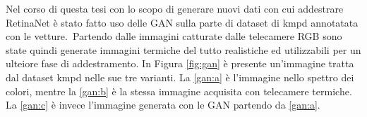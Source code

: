 Nel corso di questa tesi con lo scopo di generare nuovi dati con cui addestrare RetinaNet è stato fatto uso delle \ac{GAN} sulla parte di dataset di \ac{kmpd} annotatata con le vetture. Partendo dalle immagini catturate dalle telecamere RGB sono state quindi generate immagini termiche del tutto realistiche ed utilizzabili per un ulteiore fase di addestramento. In Figura \ref{fig:gan} è presente un'immagine tratta dal dataset \ac{kmpd} nelle sue tre varianti. La \ref{gan:a} è l'immagine nello spettro dei colori, mentre la \ref{gan:b} è la stessa immagine acquisita con telecamere termiche. La \ref{gan:c} è invece l'immagine generata con le \ac{GAN} partendo da \ref{gan:a}.
\begin{figure}[]
    \begin{minipage}{.29\linewidth}
        \centering
    \end{minipage}%
    \begin{minipage}{.29\linewidth}
        \centering
\end{minipage}
\end{figure}
